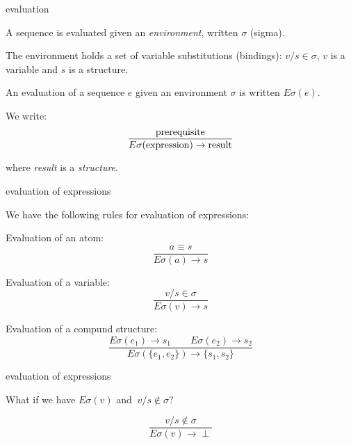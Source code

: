 \begin{frame}{evaluation}

A sequence is evaluated given an {\em environment}, written $\sigma$ (sigma).

\pause\vspace{20pt}
The environment holds a set of variable substitutions (bindings):
$v/s \in \sigma$, $v$ is a variable and $s$ is a structure.

\pause\vspace{20pt} 
An evaluation of a sequence $e$ given an environment
$\sigma$ is written $E\sigma(e)$. 

\pause\vspace{20pt}
We write:
\vspace{20pt}
$$\frac{{\rm prerequisite}}{E\sigma({\rm expression}) \rightarrow {\rm result}}$$

\vspace{20pt}
where {\em result} is a {\em structure}.

\end{frame}


\begin{frame}{evaluation of expressions}

We have the following rules for evaluation of expressions:

\vspace{10pt}\pause Evaluation of an atom: $$\frac{a \equiv s}{E\sigma(a) \rightarrow s}$$

\vspace{10pt}\pause Evaluation of a variable: $$\frac{v/s \in \sigma}{E\sigma(v) \rightarrow s}$$

\vspace{10pt}\pause Evaluation of a compund structure: $$\frac{ E\sigma(e_1) \rightarrow s_1 \qquad   E\sigma(e_2) \rightarrow s_2}{E\sigma(\lbrace e_1 , e_2\rbrace) \rightarrow \{s_1, s_2\}}$$
 
\end{frame}

\begin{frame}{evaluation of expressions}

  \vspace{20pt} What if we have $E\sigma(v)$ and $\ v/s \not\in \sigma$? 

  \pause $$\frac{ v/s \not\in \sigma}{E\sigma(v) \rightarrow  \perp}$$

\end{frame}

